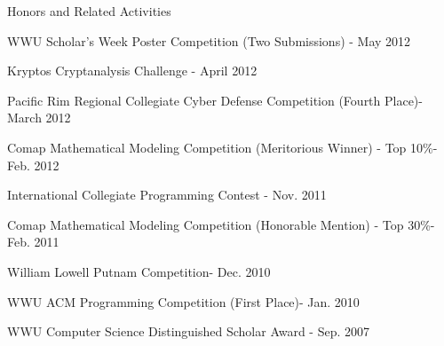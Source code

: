 \documentclass{article}
\newenvironment{*mylist}[2]{
  \subsubsection*{#1\hfill\small#2}
  \small
  \begin{list}{}{}
   \setlength{\topsep}{0pt}
   \setlength{\itemsep}{1pt}
   \setlength{\parskip}{0pt}
   \setlength{\parsep}{0pt}}{\end{list}\normalsize}
\begin{document}
\begin{*mylist}{Honors and Related Activities}{}
\item WWU Scholar's Week Poster Competition (Two Submissions) \hfill- May{ }{ } 2012
\item Kryptos Cryptanalysis Challenge \hfill- April 2012
\item Pacific Rim Regional Collegiate Cyber Defense Competition  (Fourth Place)\hfill- March 2012
\item Comap Mathematical Modeling Competition (Meritorious Winner) - Top 10\%\hfill- Feb. 2012
\item International Collegiate Programming Contest \hfill- Nov. 2011
\item Comap Mathematical Modeling Competition (Honorable Mention) - Top 30\%\hfill- Feb. 2011
\item William Lowell Putnam Competition\hfill- Dec. 2010
\item WWU ACM Programming Competition (First Place)\hfill- Jan. 2010
\item WWU Computer Science Distinguished Scholar Award \hfill- Sep. 2007
\end{*mylist}

\begin{comment}
\begin{*mylist}{Volunteer Work}{}
\item Stay Safe Seattle
\end{*mylist}

\begin{*mylist}{Affiliation}{}
\item American Computing and Machinery Society (ACM)
\item International Darksky Organization
\end{*mylist}
\end{comment}
\end{document}
